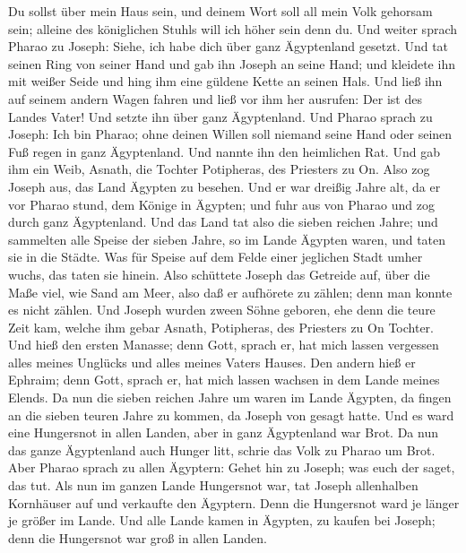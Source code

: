  Du sollst über mein Haus sein, und deinem Wort soll all
mein Volk gehorsam sein; alleine des königlichen Stuhls will ich höher
sein denn du.  Und weiter sprach Pharao zu Joseph: Siehe,
ich habe dich über ganz Ägyptenland gesetzt.  Und tat
seinen Ring von seiner Hand und gab ihn Joseph an seine Hand; und
kleidete ihn mit weißer Seide und hing ihm eine güldene Kette an seinen
Hals.  Und ließ ihn auf seinem andern Wagen fahren und ließ
vor ihm her ausrufen: Der ist des Landes Vater! Und setzte ihn über ganz
Ägyptenland.  Und Pharao sprach zu Joseph: Ich bin Pharao;
ohne deinen Willen soll niemand seine Hand oder seinen Fuß regen in ganz
Ägyptenland.  Und nannte ihn den heimlichen Rat. Und gab
ihm ein Weib, Asnath, die Tochter Potipheras, des Priesters zu On. Also
zog Joseph aus, das Land Ägypten zu besehen.  Und er war
dreißig Jahre alt, da er vor Pharao stund, dem Könige in Ägypten; und
fuhr aus von Pharao und zog durch ganz Ägyptenland.  Und
das Land tat also die sieben reichen Jahre;  und sammelten
alle Speise der sieben Jahre, so im Lande Ägypten waren, und taten sie
in die Städte. Was für Speise auf dem Felde einer jeglichen Stadt umher
wuchs, das taten sie hinein.  Also schüttete Joseph das
Getreide auf, über die Maße viel, wie Sand am Meer, also daß er
aufhörete zu zählen; denn man konnte es nicht zählen.  Und
Joseph wurden zween Söhne geboren, ehe denn die teure Zeit kam, welche
ihm gebar Asnath, Potipheras, des Priesters zu On Tochter. 
Und hieß den ersten Manasse; denn Gott, sprach er, hat mich lassen
vergessen alles meines Unglücks und alles meines Vaters Hauses.
 Den andern hieß er Ephraim; denn Gott, sprach er, hat mich
lassen wachsen in dem Lande meines Elends.  Da nun die
sieben reichen Jahre um waren im Lande Ägypten,  da fingen
an die sieben teuren Jahre zu kommen, da Joseph von gesagt hatte. Und es
ward eine Hungersnot in allen Landen, aber in ganz Ägyptenland war Brot.
 Da nun das ganze Ägyptenland auch Hunger litt, schrie das
Volk zu Pharao um Brot. Aber Pharao sprach zu allen Ägyptern: Gehet hin
zu Joseph; was euch der saget, das tut.  Als nun im ganzen
Lande Hungersnot war, tat Joseph allenhalben Kornhäuser auf und
verkaufte den Ägyptern. Denn die Hungersnot ward je länger je größer im
Lande.  Und alle Lande kamen in Ägypten, zu kaufen bei
Joseph; denn die Hungersnot war groß in allen Landen.

